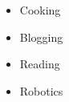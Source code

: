 %
%
%

\twocolumnsection
{
\begin{skills}
\end{skills}}
{
\vspace{1em}
\begin{itemize}
	\item Cooking
	\item Blogging                    
    \item Reading
    \item Robotics
\end{itemize}
}
